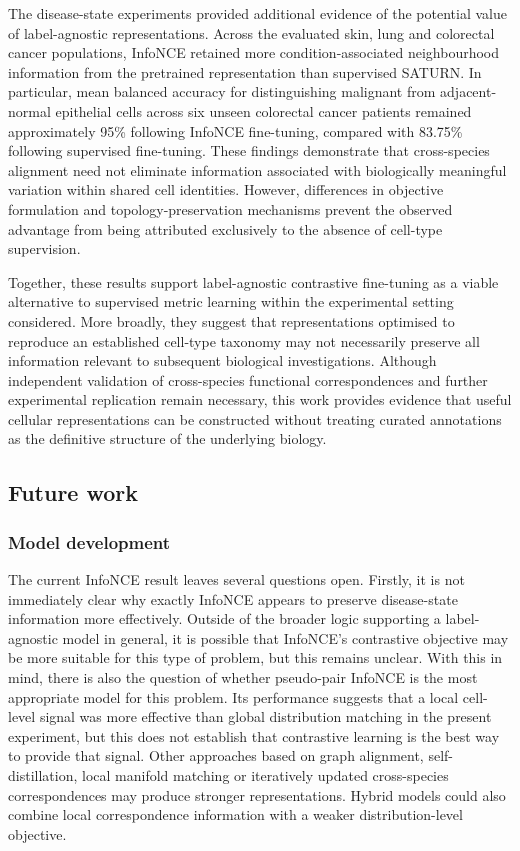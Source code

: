 \documentclass{article}
\begin{document}
The disease-state experiments provided additional evidence of the potential value of label-agnostic representations. Across the evaluated skin, lung and colorectal cancer populations, InfoNCE retained more condition-associated neighbourhood information from the pretrained representation than supervised SATURN. In particular, mean balanced accuracy for distinguishing malignant from adjacent-normal epithelial cells across six unseen colorectal cancer patients remained approximately 95\% following InfoNCE fine-tuning, compared with 83.75\% following supervised fine-tuning. These findings demonstrate that cross-species alignment need not eliminate information associated with biologically meaningful variation within shared cell identities. However, differences in objective formulation and topology-preservation mechanisms prevent the observed advantage from being attributed exclusively to the absence of cell-type supervision.

Together, these results support label-agnostic contrastive fine-tuning as a viable alternative to supervised metric learning within the experimental setting considered. More broadly, they suggest that representations optimised to reproduce an established cell-type taxonomy may not necessarily preserve all information relevant to subsequent biological investigations. Although independent validation of cross-species functional correspondences and further experimental replication remain necessary, this work provides evidence that useful cellular representations can be constructed without treating curated annotations as the definitive structure of the underlying biology.

\subsection{Future work} \label{sec:future-work}
\subsubsection{Model development}
The current InfoNCE result leaves several questions open. Firstly, it is not immediately clear why exactly InfoNCE appears to preserve disease-state information more effectively. Outside of the broader logic supporting a label-agnostic model in general, it is possible that InfoNCE's contrastive objective may be more suitable for this type of problem, but this remains unclear. With this in mind, there is also the question of whether pseudo-pair InfoNCE is the most appropriate model for this problem. Its performance suggests that a local cell-level signal was more effective than global distribution matching in the present experiment, but this does not establish that contrastive learning is the best way to provide that signal. Other approaches based on graph alignment, self-distillation, local manifold matching or iteratively updated cross-species correspondences may produce stronger representations. Hybrid models could also combine local correspondence information with a weaker distribution-level objective.
\end{document}
